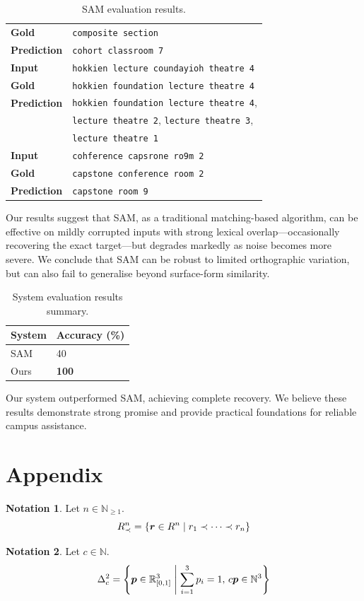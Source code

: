 \documentclass{article}
\theoremstyle{definition}
\newtheorem{notation}{Notation}
\newcommand{\N}{\mathbb{N}}
\newcommand{\R}{\mathbb{R}}
\begin{document}
\begin{table}[H]
\begin{tabularx}{\linewidth}{lX}
		\textbf{Gold} & \texttt{composite section} \\
		\textbf{Prediction} & \texttt{cohort classroom 7} \\
		\midrule
		\textbf{Input} & \texttt{hokkien lecture coundayioh theatre 4} \\
		\textbf{Gold} & \texttt{hokkien foundation lecture theatre 4} \\
		\textbf{Prediction} & \texttt{hokkien foundation lecture theatre 4}, \\
		& \texttt{lecture theatre 2}, \texttt{lecture theatre 3}, \\
		& \texttt{lecture theatre 1} \\
		\midrule
		\textbf{Input} & \texttt{cohference capsrone ro9m 2} \\
		\textbf{Gold} & \texttt{capstone conference room 2} \\
		\textbf{Prediction} & \texttt{capstone room 9} \\
		\bottomrule
	\end{tabularx}
	\caption{SAM evaluation results.}
\end{table}

\newpage

Our results suggest that SAM, as a traditional matching-based algorithm,
can be effective on mildly corrupted inputs with strong lexical overlap---occasionally recovering the exact target---but degrades markedly as noise becomes more severe.
We conclude that SAM can be robust to limited orthographic variation,
but can also fail to generalise beyond surface-form similarity.

\begin{table}[H]
	\centering
	\begin{tabular}{ll}
		\toprule
		\textbf{System} & \textbf{Accuracy} (\%) \\
		\midrule
		SAM & 40 \\
		Ours & \textbf{100} \\
		\bottomrule
	\end{tabular}
	\caption{System evaluation results summary.}
\end{table}

Our system outperformed SAM, achieving complete recovery.
We believe these results demonstrate strong promise
and provide practical foundations for reliable campus assistance.

\section{Appendix}

\begin{notation}
Let $n\in\N_{\geq 1}$.
$$
	R_{\prec}^{n}
	=
	\mleft\{
		\bm{r}\in R^{n}
		\;\middle|\;
		r_{1}\prec\dots\prec r_{n}
	\mright\}
$$
\end{notation}

\begin{notation}
Let $c\in\N$.
$$
	\Delta_{c}^{2}
	=
	\mleft\{
		\bm{p}\in\R_{[0,1]}^{3}
		\;\middle|\;
		\sum_{i=1}^{3}
		p_{i}
		=
		1
		,\,
		c\bm{p}\in\N^{3}
	\mright\}
$$
\end{notation}



\end{document}
